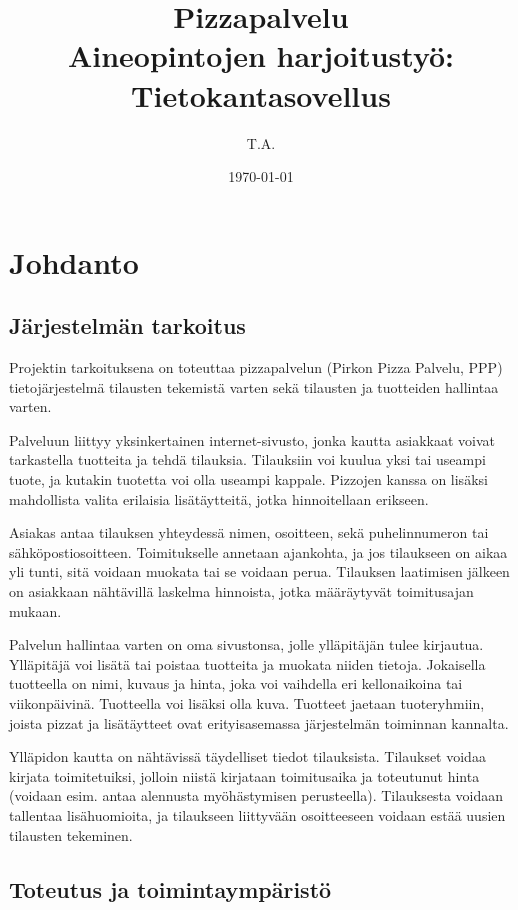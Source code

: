 \documentclass[a4paper, 12pt, finnish]{article}
\title{Pizzapalvelu\\
\large{Aineopintojen harjoitustyö: Tietokantasovellus}}
\author{T.A.}
\date{\today}
\begin{document}
\maketitle
\newpage

\section{Johdanto}
\subsection*{Järjestelmän tarkoitus}
Projektin tarkoituksena on toteuttaa pizzapalvelun (Pirkon Pizza Palvelu, PPP) tietojärjestelmä tilausten tekemistä varten sekä tilausten ja tuotteiden hallintaa varten.

Palveluun liittyy yksinkertainen internet-sivusto, jonka kautta asiakkaat voivat tarkastella tuotteita ja tehdä tilauksia. Tilauksiin voi kuulua yksi tai useampi tuote, ja kutakin tuotetta voi olla useampi kappale. Pizzojen kanssa on lisäksi mahdollista valita erilaisia lisätäytteitä, jotka hinnoitellaan erikseen.

Asiakas antaa tilauksen yhteydessä nimen, osoitteen, sekä puhelinnumeron tai sähköpostiosoitteen. Toimitukselle annetaan ajankohta, ja jos tilaukseen on aikaa yli tunti, sitä voidaan muokata tai se voidaan perua. Tilauksen laatimisen jälkeen on asiakkaan nähtävillä laskelma hinnoista, jotka määräytyvät toimitusajan mukaan.

Palvelun hallintaa varten on oma sivustonsa, jolle ylläpitäjän tulee kirjautua. Ylläpitäjä voi lisätä tai poistaa tuotteita ja muokata niiden tietoja. Jokaisella tuotteella on nimi, kuvaus ja hinta, joka voi vaihdella eri kellonaikoina tai viikonpäivinä. Tuotteella voi lisäksi olla kuva. Tuotteet jaetaan tuoteryhmiin, joista pizzat ja lisätäytteet ovat erityisasemassa järjestelmän toiminnan kannalta.

Ylläpidon kautta on nähtävissä täydelliset tiedot tilauksista. Tilaukset voidaa kirjata toimitetuiksi, jolloin niistä kirjataan toimitusaika ja toteutunut hinta (voidaan esim. antaa alennusta myöhästymisen perusteella). Tilauksesta voidaan tallentaa lisähuomioita, ja tilaukseen liittyvään osoitteeseen voidaan estää uusien tilausten tekeminen.

\subsection*{Toteutus ja toimintaympäristö}
\end{document}

